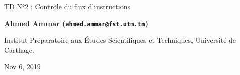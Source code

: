\documentclass[%
oneside,                 %
final,                   %
10pt,french]{article}
\begin{document}

\newcommand{\exercisesection}[1]{\subsection*{#1}}






\thispagestyle{empty}

\begin{center}
{\LARGE\bf
\begin{spacing}{1.25}
TD N°2 : Contrôle du flux d’instructions
\end{spacing}
}
\end{center}


\begin{center}
{\bf Ahmed Ammar (\texttt{ahmed.ammar@fst.utm.tn})}
\end{center}

    \begin{center}
\centerline{{\small Institut Préparatoire aux Études Scientifiques et Techniques, Université de Carthage.}}
\end{center}
    

\begin{center}
Nov 6, 2019
\end{center}

\vspace{1cm}


\tableofcontents


\vspace{1cm} %
\end{document}
